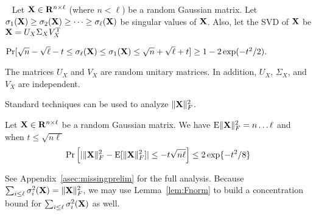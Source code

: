 \begin{lemma}\label{lem:randommat}~\cite{rudelson2010non,chafai2009singular} 
Let $\mathbf{X} \in \mathbf{R}^{n \times \ell}$ (where $n < \ell$) be a random Gaussian matrix. Let $\sigma_1(\mathbf{X}) \geq \sigma_2(\mathbf{X}) \geq \dots \geq \sigma_{\ell}(\mathbf{X})$ be singular values of $\mathbf{X}$. Also, let the SVD of $\mathbf{X}$ be 
$\mathbf{X} = U_X \Sigma_X V^{\mathrm{T}}_X$

$\Pr[\sqrt n - \sqrt \ell - t \leq \sigma_{\ell}(\mathbf{X}) \leq \sigma_1(\mathbf{X}) \leq \sqrt n + \sqrt \ell + t
    ] \\
     \geq  1 - 2\exp(-t^2/2).$
\iffalse
{\small
\begin{align*}
    & \Pr[\sqrt n - \sqrt \ell - t \leq \sigma_{\ell}(\mX) \leq \sigma_1(\mX) \leq \sqrt n + \sqrt \ell + t
    ] \\
    & \geq  1 - 2\exp(-t^2/2).\label{eqn:extremevalue} 
\end{align*}
}
\fi

 The matrices $U_X$ and $V_X$ are random unitary matrices. In addition, $U_X$, $\Sigma_X$, and $V_X$ are independent. 
\end{lemma}

Standard techniques can be used to analyze $\|\mathbf{X}\|_F^2$. 

\begin{lemma}\label{lem:Fnorm} Let $\mathbf{X} \in \mathbf{R}^{n \times \ell}$ be a random Gaussian matrix. We have 
$\mathrm{E}\|\mathbf{X}\|^2_F = n \dots \ell$
and when $t \leq \sqrt{n\ell}$
\begin{equation}\label{eqn:fnormconcentrate}
    \Pr\left[ |\|\mathbf{X}\|^2_F - \mathrm{E}[\|\mathbf{X}\|^2_F]| \leq -t \sqrt{n\ell} \right] 
     \leq 2 \exp\{-t^2/8\}
\end{equation}
\end{lemma}

See Appendix~\ref{asec:missingprelim} for the full analysis. Because $\sum_{i \leq \ell}\sigma^2_i(\mX) = \|\mX\|^2_F$, we may use Lemma~\ref{lem:Fnorm} to build a concentration bound for $\sum_{i \leq \ell}\sigma^2_i(\mX)$ as well. 


\iffalse
Recall that $\sum_{i \leq \ell}\sigma^2_i(\mX) = \|\mX\|^2_F$. 
Lemma~\ref{lem:Fnorm} also gives a concentration bound for $\sum_{i \leq \ell}\sigma^2_i(\mX)$. 

\begin{equation}
    \Pr\left[  \sum_{i \leq \ell}\sigma^2_i(\mX) - n \ell \geq t \sqrt{n \ell}\right] \leq \exp\{-\frac{t^2}{4(1+c_1)}\}
\end{equation}
where $c_1 \geq \frac{t}{\sqrt{n\ell}}$ and $t >0$.

\begin{equation}
    \Pr\left[  \sum_{i \leq \ell}\sigma^2_i(\mX) - n \ell \leq -t \sqrt{n \ell}\right] \leq \exp\{-\frac{t^2}{4(1-c_2)}\}
\end{equation}
where $0<t<\sqrt{n\ell}$ and $0 \leq c_2 \leq \frac{t}{\sqrt{n\ell}}$.

\fi


